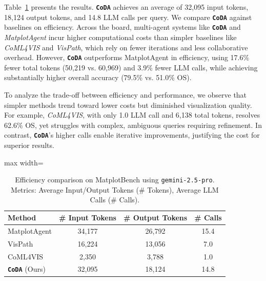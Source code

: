 \documentclass[11pt, a4paper, logo, copyright]{googlecloud}
\newcommand{\methodname}{\textbf{\texttt{\textcolor{StarIndigo}{C}\textcolor{StarIndigo}{o}\textcolor{StarCoral}{D}\textcolor{StarTeal}{A}}}}
\newcommand{\io}[1]{\setlength{\fboxsep}{1pt}\colorbox{gray!10}{\texttt{#1}}}
\begin{document}
Table~\ref{tab:efficiency-comparison} presents the results. \methodname{} achieves an average of 32,095 input tokens, 18,124 output tokens, and 14.8 LLM calls per query.
We compare \methodname{} against baselines on efficiency. Across the board, multi-agent systems like \methodname{} and \textit{MatplotAgent} incur higher computational costs than simpler baselines like \textit{CoML4VIS} and \textit{VisPath}, which rely on fewer iterations and less collaborative overhead. However, \methodname{} outperforms MatplotAgent in efficiency, using 17.6\% fewer total tokens (50,219 vs. 60,969) and 3.9\% fewer LLM calls, while achieving substantially higher overall accuracy (79.5\% vs. 51.0\% OS).

To analyze the trade-off between efficiency and performance, we observe that simpler methods trend toward lower costs but diminished visualization quality. For example, \textit{CoML4VIS}, with only 1.0 LLM call and 6,138 total tokens, resolves 62.6\% OS, yet struggles with complex, ambiguous queries requiring refinement. In contrast, \methodname{}'s higher calls enable iterative improvements, justifying the cost for superior results.



\begin{table}[t]
\centering
\footnotesize
\setlength{\tabcolsep}{8pt}
\begin{adjustbox}{max width=\linewidth}
\begin{tabular}{|l|c|c|c|}
\hline
\textbf{Method} & \textbf{\# Input Tokens} & \textbf{\# Output Tokens} & \textbf{\# Calls} \\
\hline
MatplotAgent       & 34,177 & 26,792 & 15.4 \\
VisPath            & 16,224 & 13,056 & 7.0 \\
CoML4VIS           & 2,350 & 3,788 & 1.0 \\ \hline
\methodname{} (Ours) & 32,095 & 18,124 & 14.8 \\
\hline
\end{tabular}
\end{adjustbox}
\caption{Efficiency comparison on MatplotBench using \io{gemini-2.5-pro}. Metrics: Average Input/Output Tokens (\# Tokens), Average LLM Calls (\# Calls).}
\label{tab:efficiency-comparison}
\end{table}
\end{document}
